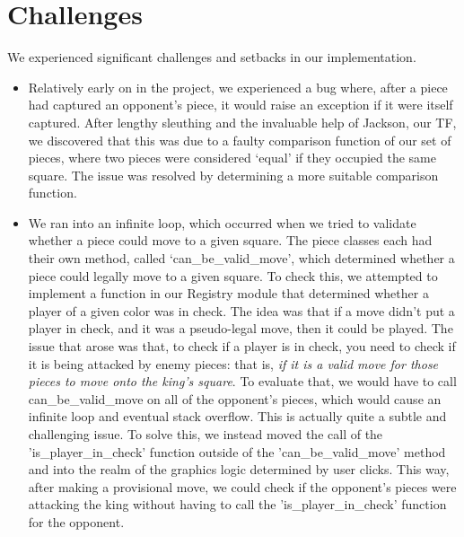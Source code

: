 \documentclass{article}
\begin{document}
\section{Challenges}
We experienced significant challenges and setbacks in our implementation.
\begin{itemize}

    \item Relatively early on in the project, we experienced a bug where, after a piece had captured an opponent's piece, it would raise an exception if it were itself captured. After lengthy sleuthing and the invaluable help of Jackson, our TF, we discovered that this was due to a faulty comparison function of our set of pieces, where two pieces were considered `equal' if they occupied the same square. The issue was resolved by determining a more suitable comparison function.
    
    \item We ran into an infinite loop, which occurred when we tried to validate whether a piece could move to a given square. The piece classes each had their own method, called `can\_be\_valid\_move', which determined whether a piece could legally move to a given square. To check this, we attempted to implement a function in our Registry module that determined whether a player of a given color was in check. The idea was that if a move didn't put a player in check, and it was a pseudo-legal move, then it could be played. The issue that arose was that, to check if a player is in check, you need to check if it is being attacked by enemy pieces: that is, \textit{if it is a valid move for those pieces to move onto the king's square}. To evaluate that, we would have to call can\_be\_valid\_move on all of the opponent's pieces, which would cause an infinite loop and eventual stack overflow. This is actually quite a subtle and challenging issue. 
    To solve this, we instead moved the call of the 'is\_player\_in\_check' function outside of the 'can\_be\_valid\_move' method and into the realm of the graphics logic determined by user clicks. This way, after making a provisional move, we could check if the opponent's pieces were attacking the king without having to call the 'is\_player\_in\_check' function for the opponent. 



\end{itemize}
\end{document}

